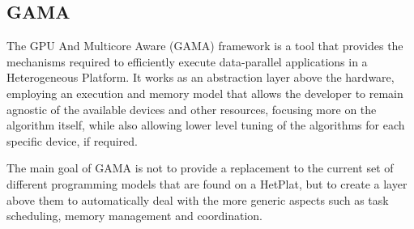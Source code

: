 \subsection{GAMA}
\label{sec:gama}

The GPU And Multicore Aware (GAMA) framework is a tool that provides the mechanisms required to efficiently execute data-parallel applications in a Heterogeneous Platform. It works as an abstraction layer above the hardware, employing an execution and memory model that allows the developer to remain agnostic of the available devices and other resources, focusing more on the algorithm itself, while also allowing lower level tuning of the algorithms for each specific device, if required.

The main goal of GAMA is not to provide a replacement to the current set of different programming models that are found on a HetPlat, but to create a layer above them to automatically deal with the more generic aspects such as task scheduling, memory management and coordination.



